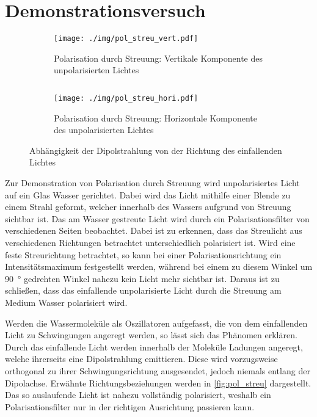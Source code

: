 \chapter{Demonstrationsversuch}
\begin{figure}[tb]
	\begin{subfigure}{.4\textwidth}
		\centering
		\texttt{[image: ./img/pol\_streu\_vert.pdf]}
		\caption[Vertikale Komponente]{Polarisation durch Streuung: Vertikale Komponente des unpolarisierten Lichtes}
	\end{subfigure}
	$\quad$
	\begin{subfigure}{.4\textwidth}
		\centering
		\texttt{[image: ./img/pol\_streu\_hori.pdf]}
		\caption[Horizontale Komponente]{Polarisation durch Streuung: Horizontale Komponente des unpolarisierten Lichtes}
	\end{subfigure}
	\caption[Visualisierung der Richtungsabhängigkeiten]{Abhängigkeit der Dipolstrahlung von der Richtung des einfallenden Lichtes}
	\label{fig:pol_streu}
\end{figure}

Zur Demonstration von Polarisation durch Streuung wird unpolarisiertes Licht auf ein Glas Wasser gerichtet.
Dabei wird das Licht mithilfe einer Blende zu einem Strahl geformt, welcher innerhalb des Wassers aufgrund von Streuung sichtbar ist.
Das am Wasser gestreute Licht wird durch ein Polarisationsfilter von verschiedenen Seiten beobachtet.
Dabei ist zu erkennen, dass das Streulicht aus verschiedenen Richtungen betrachtet unterschiedlich polarisiert ist.
Wird eine feste Streurichtung betrachtet, so kann bei einer Polarisationsrichtung ein Intensitätsmaximum festgestellt werden, während bei einem zu diesem Winkel um \SI{90}{\degree} gedrehten Winkel nahezu kein Licht mehr sichtbar ist.
Daraus ist zu schließen, dass das einfallende unpolarisierte Licht durch die Streuung am Medium Wasser polarisiert wird.

Werden die Wassermoleküle als Oszillatoren aufgefasst, die von dem einfallenden Licht zu Schwingungen angeregt werden, so lässt sich das Phänomen erklären.
Durch das einfallende Licht werden innerhalb der Moleküle Ladungen angeregt, welche ihrerseits eine Dipolstrahlung emittieren.
Diese wird vorzugsweise orthogonal zu ihrer Schwingungsrichtung ausgesendet, jedoch niemals entlang der Dipolachse.
Erwähnte Richtungsbeziehungen werden in \autoref{fig:pol_streu} dargestellt.
Das so auslaufende Licht ist nahezu vollständig polarisiert, weshalb ein Polarisationsfilter nur in der richtigen Ausrichtung passieren kann.
